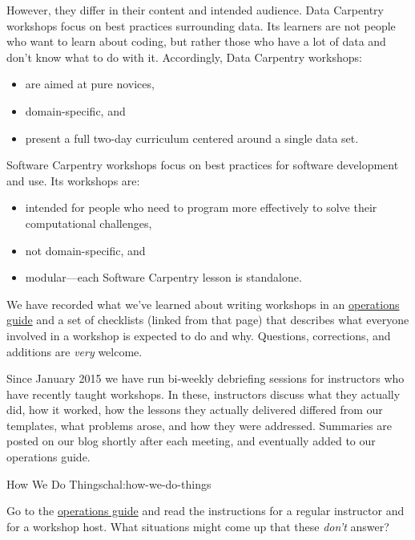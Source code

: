 However, they differ in their content and intended audience. Data
Carpentry workshops focus on best practices surrounding data. Its
learners are not people who want to learn about coding, but rather those
who have a lot of data and don't know what to do with it. Accordingly,
Data Carpentry workshops:

\begin{itemize}
\item
  are aimed at pure novices,
\item
  domain-specific, and
\item
  present a full two-day curriculum centered around a single data set.
\end{itemize}

Software Carpentry workshops focus on best practices for software
development and use. Its workshops are:

\begin{itemize}
\item
  intended for people who need to program more effectively to solve
  their computational challenges,
\item
  not domain-specific, and
\item
  modular---each Software Carpentry lesson is standalone.
\end{itemize}



We have recorded what we've learned about writing workshops in an
\href{http://software-carpentry.org/workshops/operations/}{operations
guide} and a set of checklists (linked from that page) that describes
what everyone involved in a workshop is expected to do and why.
Questions, corrections, and additions are \emph{very} welcome.

Since January 2015 we have run bi-weekly debriefing sessions for
instructors who have recently taught workshops. In these, instructors
discuss what they actually did, how it worked, how the lessons they
actually delivered differed from our templates, what problems arose, and
how they were addressed. Summaries are posted on our blog shortly after
each meeting, and eventually added to our operations guide.

\begin{challenge}{How We Do Things}{chal:how-we-do-things}

Go to the
\href{http://software-carpentry.org/workshops/operations/}{operations
guide} and read the instructions for a regular instructor and for a
workshop host. What situations might come up that these \emph{don't}
answer?
\end{challenge}

